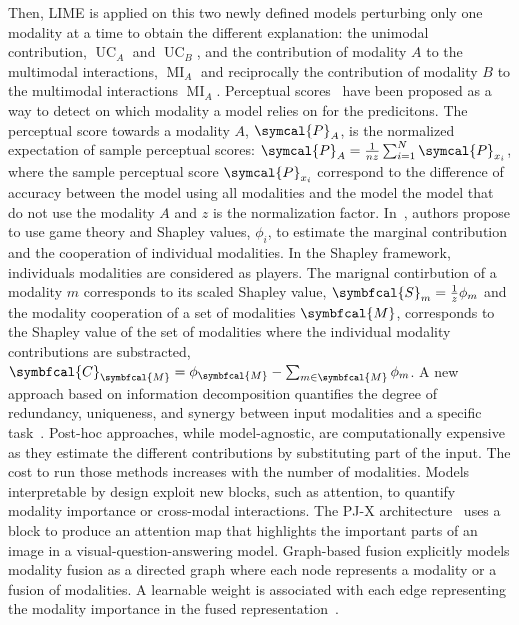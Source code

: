 \documentclass[../main.tex]{subfiles}
\begin{document}
	Then, LIME is applied on this two newly defined models perturbing only one modality at a time to obtain the different explanation: the unimodal contribution, \(\operatorname{UC}_A\) and \(\operatorname{UC}_B\), and the contribution of modality \(A\) to the multimodal interactions, \(\operatorname{MI}_A\) and reciprocally the contribution of modality \(B\) to the multimodal interactions \(\operatorname{MI}_A\).
	Perceptual scores~\cite{PerceptualScores} have been proposed as a way to detect on which modality a model relies on for the predicitons.
	The perceptual score towards a modality \(A\), \(\symcal{P}_A\), is the normalized expectation of sample perceptual scores: \(\symcal{P}_A = \frac{1}{nz}\sum_{i=1}^{N}\symcal{P}_{x_i}\), where the sample perceptual score \(\symcal{P}_{x_i}\) correspond to the difference of accuracy between the model using all modalities and the model the model that do not use the modality \(A\) and \(z\) is the normalization factor.
	In~\cite{SHAPE}, authors propose to use game theory and Shapley values, \(\phi_i\), to estimate the marginal contribution and the cooperation of individual modalities.
	In the Shapley framework, individuals modalities are considered as players.
	The marignal contirbution of a modality \(m\) corresponds to its scaled Shapley value, \(\symbfcal{S}_m = \frac{1}{z}\phi_m\) and the modality cooperation of a set of modalities \(\symbfcal{M}\),  corresponds to the Shapley value of the set of modalities where the individual modality contributions are substracted, \(\symbfcal{C}_{\symbfcal{M}} = \phi_{\symbfcal{M}} - \sum_{m \in \symbfcal{M}}\phi_m\).
	A new approach based on information decomposition quantifies the degree of redundancy, uniqueness, and synergy between input modalities and a specific task~\cite{liang2023multimodal,liang2023quantifying}.
	Post-hoc approaches, while model-agnostic, are computationally expensive as they estimate the different contributions by substituting part of the input.
	The cost to run those methods increases with the number of modalities.
	Models interpretable by design exploit new blocks, such as attention, to quantify modality importance or cross-modal interactions.
	The PJ-X architecture~\cite{8579013} uses a block to produce an attention map that highlights the important parts of an image in a visual-question-answering model.
	Graph-based fusion explicitly models modality fusion as a directed graph where each node represents a modality or a fusion of modalities.
	A learnable weight is associated with each edge representing the modality importance in the fused representation~\cite{bagher-zadeh-etal-2018-multimodal}.
\end{document}
